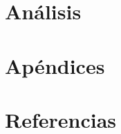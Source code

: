 \documentclass{article}
\begin{document}
\section{Análisis}
\section{Apéndices}
\section{Referencias}
\end{document}
